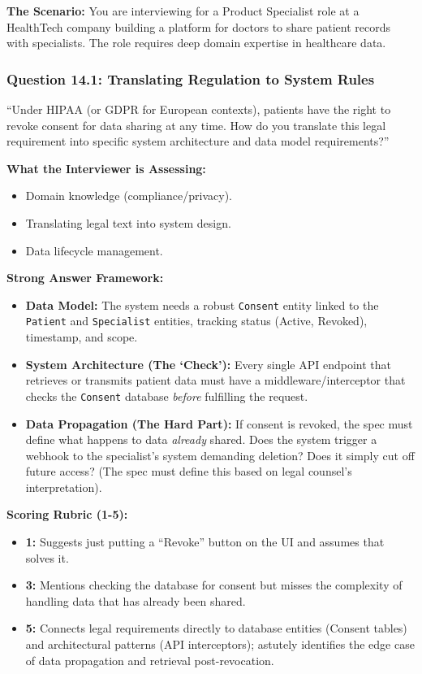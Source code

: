 \documentclass[
  11pt,
  openany,
  oneside]{book}
\providecommand{\tightlist}{%
  \setlength{\itemsep}{0pt}\setlength{\parskip}{0pt}}
\begin{document}
\textbf{The Scenario:} You are interviewing for a Product Specialist
role at a HealthTech company building a platform for doctors to share
patient records with specialists. The role requires deep domain
expertise in healthcare data.

\subsubsection{Question 14.1: Translating Regulation to System
Rules}\label{question-14.1-translating-regulation-to-system-rules}

``Under HIPAA (or GDPR for European contexts), patients have the right
to revoke consent for data sharing at any time. How do you translate
this legal requirement into specific system architecture and data model
requirements?''

\textbf{What the Interviewer is Assessing:}

\begin{itemize}
\tightlist
\item
  Domain knowledge (compliance/privacy).
\item
  Translating legal text into system design.
\item
  Data lifecycle management.
\end{itemize}

\textbf{Strong Answer Framework:}

\begin{itemize}
\tightlist
\item
  \textbf{Data Model:} The system needs a robust \texttt{Consent} entity
  linked to the \texttt{Patient} and \texttt{Specialist} entities,
  tracking status (Active, Revoked), timestamp, and scope.
\item
  \textbf{System Architecture (The `Check'):} Every single API endpoint
  that retrieves or transmits patient data must have a
  middleware/interceptor that checks the \texttt{Consent} database
  \emph{before} fulfilling the request.
\item
  \textbf{Data Propagation (The Hard Part):} If consent is revoked, the
  spec must define what happens to data \emph{already} shared. Does the
  system trigger a webhook to the specialist's system demanding
  deletion? Does it simply cut off future access? (The spec must define
  this based on legal counsel's interpretation).
\end{itemize}

\textbf{Scoring Rubric (1-5):}

\begin{itemize}
\tightlist
\item
  \textbf{1:} Suggests just putting a ``Revoke'' button on the UI and
  assumes that solves it.
\item
  \textbf{3:} Mentions checking the database for consent but misses the
  complexity of handling data that has already been shared.
\item
  \textbf{5:} Connects legal requirements directly to database entities
  (Consent tables) and architectural patterns (API interceptors);
  astutely identifies the edge case of data propagation and retrieval
  post-revocation.
\end{itemize}
\end{document}
